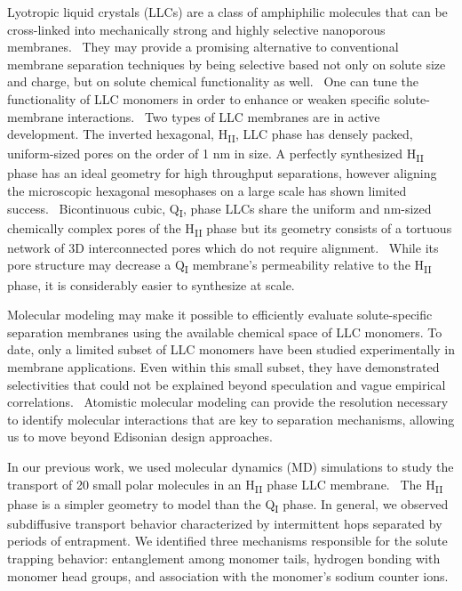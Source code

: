 \documentclass{article}
\begin{document}
  Lyotropic liquid crystals (LLCs) are a class of amphiphilic molecules that can be 
  cross-linked into mechanically strong and highly selective nanoporous membranes.~\cite{gin_polymerized_2008}
  They may provide a promising alternative to 
  conventional membrane separation techniques by being selective based not only on solute
  size and charge, but on solute chemical functionality as well.~\cite{dischinger_application_2017}
  One can tune the functionality of LLC monomers
  in order to enhance or weaken specific solute-membrane interactions.~\cite{dischinger_effect_2017}
  Two types of LLC membranes are in active development. The inverted hexagonal, 
  H\textsubscript{II}, LLC phase has densely packed, uniform-sized pores on the order of 1 nm
  in size. A perfectly synthesized H\textsubscript{II} phase has an ideal geometry for high
  throughput separations, however aligning the microscopic hexagonal mesophases on a large 
  scale has shown limited success.~\cite{feng_scalable_2014,feng_thin_2016} Bicontinuous cubic,
  Q\textsubscript{I}, phase LLCs share the uniform and nm-sized chemically complex pores of
  the H\textsubscript{II} phase but its geometry consists of a tortuous network of 3D 
  interconnected pores which do not require alignment.~\cite{carter_glycerol-based_2012} While 
  its pore structure may decrease a Q\textsubscript{I} membrane's permeability relative to the
  H\textsubscript{II} phase, it is considerably easier to synthesize at scale.
  
  Molecular modeling may make it possible to efficiently evaluate solute-specific separation
  membranes using the available chemical space of LLC monomers. To date, only a limited 
  subset of LLC monomers have been studied experimentally in membrane applications.
  \cite{carter_glycerol-based_2012,hatakeyama_nanoporous_2010,smith_ordered_1997,zhou_assembly_2003,resel_structural_2000}
  Even within this small subset, they have demonstrated selectivities that could not be
  explained beyond speculation and vague empirical correlations.~\cite{dischinger_application_2017}
  Atomistic molecular modeling can provide the resolution necessary to identify molecular 
  interactions that are key to separation mechanisms, allowing us to move beyond 
  Edisonian design approaches.

  In our previous work, we used molecular dynamics (MD) simulations to study the transport
  of 20 small polar molecules in an H\textsubscript{II} phase LLC membrane.~\cite{coscia_chemically_2019}
  The H\textsubscript{II} phase is a simpler geometry to model than the Q\textsubscript{I} phase.  
  In general, we observed subdiffusive transport behavior characterized by intermittent hops 
  separated by periods of entrapment. We identified three mechanisms responsible for the 
  solute trapping behavior: entanglement among monomer tails, hydrogen bonding with monomer
  head groups, and association with the monomer's sodium counter ions.
  
\end{document}
